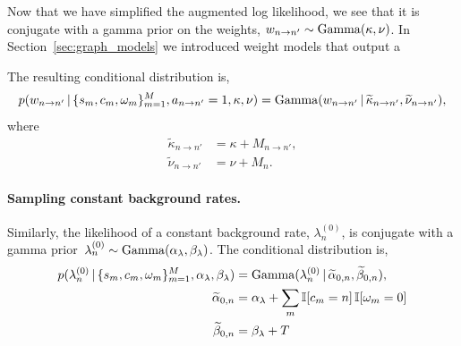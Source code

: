 Now that we have simplified the augmented log likelihood, we see that it is
conjugate with a gamma prior on the weights,
${w_{n \to n'} \sim \mathrm{Gamma}(\kappa, \nu})$.
In Section~\ref{sec:graph_models} we introduced weight models that 
output a

The resulting conditional distribution is,
\begin{multline*}
  p(w_{n \to n'}\,|\, \{s_m,c_m,\omega_m\}_{m=1}^M, a_{n\to n'}=1, \kappa, \nu)
  = 
  \mathrm{Gamma}(w_{n \to n'} \,|\, \widetilde{\kappa}_{n \to n'}, \widetilde{\nu}_{n \to n'}),
\end{multline*}
where
\begin{align*}
  \widetilde{\kappa}_{n \to n'} &= \kappa + M_{n \to n'}, \\
  \widetilde{\nu}_{n \to n'} &= \nu + M_n.
\end{align*}


\paragraph{Sampling constant background rates.}
Similarly, the likelihood of a constant background rate,
${\lambda^{(0)}_{n}}$, is conjugate with a gamma
prior~${\lambda^{(0)}_{n} \sim
  \mathrm{Gamma}(\alpha_{\lambda},\beta_{\lambda})}$.  The conditional
distribution is,
\begin{align*}
  p(\lambda^{(0)}_{n} \,|\, \{s_m,c_m, \omega_m\}_{m=1}^M, \alpha_\lambda, \beta_\lambda)
  &=
  \mathrm{Gamma}(\lambda^{(0)}_{n} \,|\, \widetilde{\alpha}_{0,n},  \widetilde{\beta}_{0,n}),\\
  \widetilde{\alpha}_{0,n} &= \alpha_{\lambda} + \sum_m \mathbb{I}[c_m = n] \, \mathbb{I}[\omega_m=0] \\
  \widetilde{\beta}_{0,n} &= \beta_\lambda + T
\end{align*}


